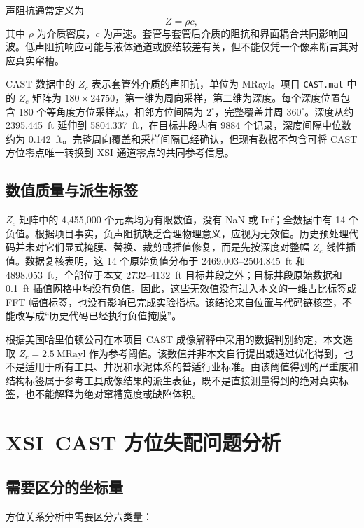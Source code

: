 声阻抗通常定义为
\begin{equation}
  Z=\rho c,
  \label{eq:acoustic-impedance}
\end{equation}
其中 $\rho$ 为介质密度，$c$ 为声速。套管与套管后介质的阻抗和界面耦合共同影响回波。低声阻抗响应可能与液体通道或胶结较差有关，但不能仅凭一个像素断言其对应真实窜槽。

CAST 数据中的 $Z_c$ 表示套管外介质的声阻抗，单位为 MRayl。项目 \texttt{CAST.mat} 中的 $Z_c$ 矩阵为 $180\times24750$，第一维为周向采样，第二维为深度。每个深度位置包含 180 个等角度方位采样点，相邻方位间隔为 $2^\circ$，完整覆盖井周 $360^\circ$。深度从约 2395.445~ft 延伸到 5804.337~ft，在目标井段内有 9884 个记录，深度间隔中位数约为 0.142~ft。完整周向覆盖和采样间隔已经确认，但现有数据不包含可将 CAST 方位零点唯一转换到 XSI 通道零点的共同参考信息。

\subsection{数值质量与派生标签}

$Z_c$ 矩阵中的 4,455,000 个元素均为有限数值，没有 NaN 或 Inf；全数据中有 14 个负值。根据项目事实，负声阻抗缺乏合理物理意义，应视为无效值。历史预处理代码并未对它们显式掩膜、替换、裁剪或插值修复，而是先按深度对整幅 $Z_c$ 线性插值。数据复核表明，这 14 个原始负值分布于 2469.003--2504.845~ft 和 4898.053~ft，全部位于本文 2732--4132~ft 目标井段之外；目标井段原始数据和 0.1~ft 插值网格中均没有负值。因此，这些无效值没有进入本文的一维占比标签或 FFT 幅值标签，也没有影响已完成实验指标。该结论来自位置与代码链核查，不能改写成“历史代码已经执行负值掩膜”。

根据美国哈里伯顿公司在本项目 CAST 成像解释中采用的数据判别约定，本文选取 $Z_c=2.5~\mathrm{MRayl}$ 作为参考阈值。该数值并非本文自行提出或通过优化得到，也不是适用于所有工具、井况和水泥体系的普适行业标准。由该阈值得到的严重度和结构标签属于参考工具成像结果的派生表征，既不是直接测量得到的绝对真实标签，也不能解释为绝对窜槽宽度或缺陷体积。

\section{XSI--CAST 方位失配问题分析}

\subsection{需要区分的坐标量}

方位关系分析中需要区分六类量：

